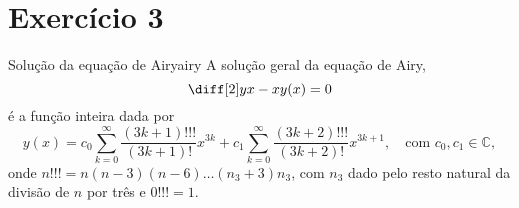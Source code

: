\section*{Exercício 3}
\begin{proposition}{Solução da equação de Airy}{airy}
    A solução geral da equação de Airy,
    \begin{equation*}
        \diff[2]yx - xy(x) = 0
    \end{equation*}
    é a função inteira dada por
    \begin{equation*}
        y(x) = c_0\sum_{k=0}^\infty\frac{(3k + 1)!!!}{(3k+1)!}x^{3k} + c_1\sum_{k = 0}^\infty \frac{(3k+2)!!!}{(3k+2)!}x^{3k+1},\quad\text{com }c_0,c_1 \in \mathbb{C},
    \end{equation*}
    onde \(n!!! = n(n-3)(n-6)\dots(n_3 + 3) n_3\), com \(n_3\) dado pelo resto natural da divisão de \(n\) por três e \(0!!! = 1\).
\end{proposition}
